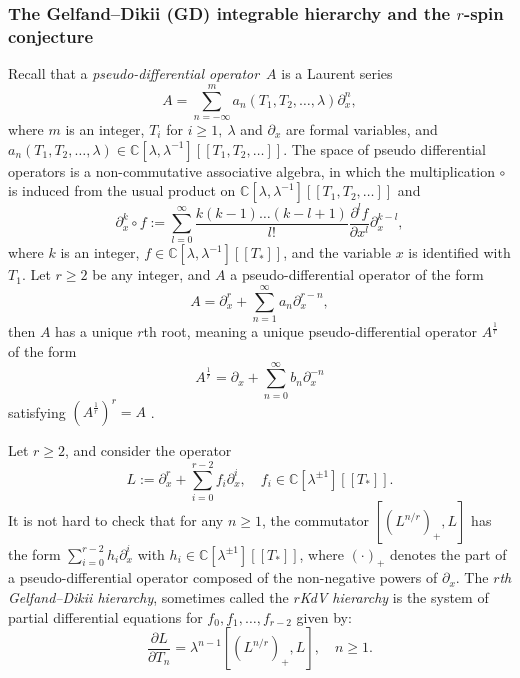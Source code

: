 \documentclass[11pt]{amsart}
\theoremstyle{definition}
\theoremstyle{remark}
\renewcommand{\d}{\ensuremath{\partial}}
\newcommand{\<}{\left<}
\renewcommand{\>}{\right>}
\numberwithin{equation}{section}
\def\C{{\mathbb C}}
\begin{document}
\subsubsection{The Gelfand--Dikii (GD) integrable hierarchy and the $r$-spin conjecture}\label{subsub:rGD_closed}

Recall that a {\it pseudo-differential operator}~$A$ is a Laurent series
\[
A=\sum_{n=-\infty}^m a_n(T_1,T_2,\ldots,\lambda)\partial_x^n,
\]
where $m$ is an integer,  $T_i$ for $i\geq 1,~\lambda$ and $\partial_x$ are formal variables, and $a_n(T_1,T_2,\ldots,\lambda)\in\C[\lambda,\lambda^{-1}][[T_1,T_2,\ldots]]$.     The space of pseudo differential operators is a non-commutative %
associative algebra, in %
which the multiplication $\circ$ is induced from the usual product on $\C[\lambda,\lambda^{-1}][[T_1,T_2,\ldots]]$ and 
\[
\d_x^k\circ f:=\sum_{l=0}^\infty\frac{k(k-1)\ldots(k-l+1)}{l!}\frac{\d^lf}{\d x^l}\d_x^{k-l},
\]
where $k$ is an integer, $f\in\mathbb C[\lambda,\lambda^{-1}][[T_*]]$, and the variable $x$ is identified with $T_1$. Let $r\geq 2$ be %
any integer, and %
$A$ a pseudo-differential operator of the form
\[
A=\partial_x^r+\sum_{n=1}^\infty a_n\partial_x^{r-n},
\]
then $A$ has a unique $r$th root, meaning a unique pseudo-differential operator $A^{\frac{1}{r}}$ of the %
form
\[
A^{\frac{1}{r}}=\partial_x+\sum_{n=0}^\infty b_n\partial_x^{-n}
\]
satisfying $\left(A^{\frac{1}{r}}\right)^r=A$%
.

Let $r\geq 2$, and consider the operator
$$
L:=\partial_x^r+\sum_{i=0}^{r-2}f_i\partial_x^i,\quad f_i\in\C[\lambda^{\pm1}][[T_*]].
$$
It is not hard to check that for any $n\geq 1$, the commutator $[(L^{n/r})_+,L]$ has the form $\sum_{i=0}^{r-2}h_i\partial_x^i$ with $h_i\in\C[\lambda^{\pm1}][[T_*]]$, where $(\cdot)_+$ denotes the part of a pseudo-differential operator composed of %
the non-negative powers %
of $\partial_x$. The {\it $r$th Gelfand--Dikii hierarchy}, sometimes called %
the \emph{$r$KdV hierarchy} is %
the system of partial differential equations for $f_0,f_1,\ldots,f_{r-2}$ %
given by:
\begin{equation}
    \label{eq:GD_hier}
\frac{\partial L}{\partial T_n}=\lambda^{n-1}[(L^{n/r})_+,L],\quad n\geq 1.
\end{equation}
\end{document}
